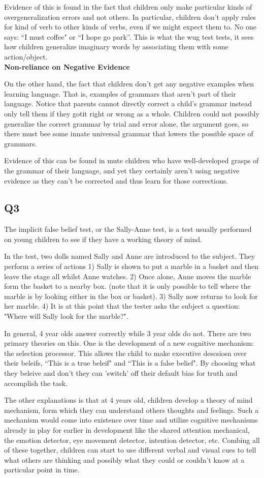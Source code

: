 \documentclass{article}
\begin{document}
Evidence of this is found in the fact that children only make particular kinds of overgeneralization errors and not others. In particular, children don't apply rules for kind of verb to other kinds of verbs, even if we might expect them to. No one says: ``I must coffee" or ``I hope go park''. This is what the wug test tests, it sees how children generalize imaginary words by associating them with some action/object.\\
\textbf{Non-reliance on Negative Evidence}

On the other hand, the fact that children don't get any negative examples when learning language. That is, examples of grammars that aren't part of their language. Notice that parents cannot directly correct a child's grammar instead only tell them if they gotit right or wrong as a whole. Children could not possibly generalize the correct grammar by trial and error alone, the argument goes, so there must bee some innate universal grammar that lowers the possible space of grammars.

Evidence of this can be found in mute children who have well-developed grasps of the grammar of their language, and yet they certainly aren't using negative evidence as they can't be corrected and thus learn for those corrections.

\subsection*{Q3}
The implicit false belief test, or the Sally-Anne test, is a test usually performed on young children to see if they have a working theory of mind.

In the test, two dolls named Sally and Anne are introduced to the subject. They perform a series of actions 1) Sally is shown to put a marble in a basket and then leave the stage all whilst Anne watches. 2) Once alone, Anne moves the marble form the basket to a nearby box. (note that it is only possible to tell where the marble is by looking either in the box or basket). 3) Sally now returns to look for her marble. 4) It is at this point that the tester asks the subject a question: "Where will Sally look for the marble?".

In general, 4 year olds answer correctly while 3 year olds do not. There are two primary theories on this. One is the development of a new cognitive mechanism: the selection processor. This allows the child to make executive descsiosn over their beleifs, ``This is a true beleif" and ``This is a false belief". By choosing what they beleive and don't they can 'switch' off their default bias for truth and accomplish the task.

The other explanations is that at 4 years old, children develop a theory of mind mechanism, form which they can understand others thoughts and feelings. Such a mechanism would come into existence over time and utilize cognitive mechanisms already in play for earlier in development like the shared attention mechanical, the emotion detector, eye movement detector, intention detector, etc. Combing all of these together, children can start to use different verbal and visual cues to tell what others are thinking and possibly what they could or couldn't know at a particular point in time.
\end{document}
